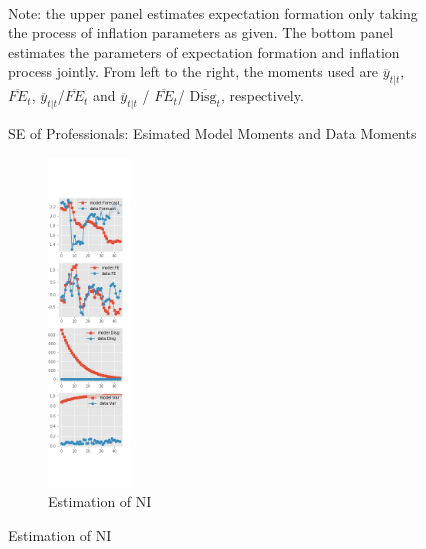 \documentclass[]{article}
\begin{document}
\begin{figure}[ht]
\begin{subfigure}[b]{\textwidth}
	\end{subfigure}
	\\
	\begin{flushleft}
		{\footnotesize Note: the upper panel estimates expectation formation only taking the process of inflation parameters as given. The bottom panel estimates the parameters of expectation formation and inflation process jointly. From left to the right, the moments used are $\overline y_{t|t}$, $\overline{FE}_{t}$, $\overline y_{t|t}$/$\overline{FE}_{t}$ and $\overline y_{t|t}$ / $\overline{FE}_{t}$/ $\overline{\textrm{Disg}_t}$, respectively. }
	\end{flushleft}
	\caption{SE of Professionals: Esimated Model Moments and Data Moments}
\end{figure}


\begin{figure}[ht]
	\centering
	\begin{subfigure}[b]{\textwidth}
		\centering
		\caption{Estimation of NI}
		\label{NI_diag_SPF}
		\includegraphics[width=0.24\textwidth]{figures/spf_ni_est_diag0.png}

\end{subfigure}
\end{figure}
\end{document}
